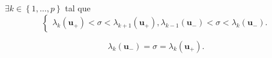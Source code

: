 \begin{definition}
	$\exists k\in\left\{1,\dotsc,p\right\}$ tal que
	\begin{equation*}
		\begin{cases}
			\lambda_{k}\left(\symbf{u}_{+}\right)<\sigma<\lambda_{k+1}\left(\symbf{u}_{+}\right),
			\lambda_{k-1}\left(\symbf{u}_{-}\right)<\sigma<\lambda_{k}\left(\symbf{u}_{-}\right).
		\end{cases}
	\end{equation*}

	\begin{equation*}
		\lambda_{k}\left(\symbf{u}_{-}\right)=\sigma=\lambda_{k}\left(\symbf{u}_{+}\right).
	\end{equation*}
\end{definition}
